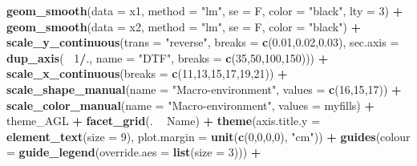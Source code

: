 \documentclass[
]{article}
\newenvironment{Shaded}{\begin{snugshade}}{\end{snugshade}}
\newcommand{\DataTypeTok}[1]{\textcolor[rgb]{0.13,0.29,0.53}{#1}}
\newcommand{\DecValTok}[1]{\textcolor[rgb]{0.00,0.00,0.81}{#1}}
\newcommand{\FloatTok}[1]{\textcolor[rgb]{0.00,0.00,0.81}{#1}}
\newcommand{\KeywordTok}[1]{\textcolor[rgb]{0.13,0.29,0.53}{\textbf{#1}}}
\newcommand{\NormalTok}[1]{#1}
\newcommand{\OperatorTok}[1]{\textcolor[rgb]{0.81,0.36,0.00}{\textbf{#1}}}
\newcommand{\StringTok}[1]{\textcolor[rgb]{0.31,0.60,0.02}{#1}}
\begin{document}
\begin{Shaded}
\begin{Highlighting}[]
{{{{{\StringTok{  }\KeywordTok{geom_smooth}\NormalTok{(}\DataTypeTok{data =}\NormalTok{ x1, }\DataTypeTok{method =} \StringTok{"lm"}\NormalTok{, }\DataTypeTok{se =}\NormalTok{ F, }\DataTypeTok{color =} \StringTok{"black"}\NormalTok{, }\DataTypeTok{lty =} \DecValTok{3}\NormalTok{) }\OperatorTok{+}
\StringTok{  }\KeywordTok{geom_smooth}\NormalTok{(}\DataTypeTok{data =}\NormalTok{ x2, }\DataTypeTok{method =} \StringTok{"lm"}\NormalTok{, }\DataTypeTok{se =}\NormalTok{ F, }\DataTypeTok{color =} \StringTok{"black"}\NormalTok{) }\OperatorTok{+}
\StringTok{  }\KeywordTok{scale_y_continuous}\NormalTok{(}\DataTypeTok{trans =} \StringTok{"reverse"}\NormalTok{, }\DataTypeTok{breaks =} \KeywordTok{c}\NormalTok{(}\FloatTok{0.01}\NormalTok{,}\FloatTok{0.02}\NormalTok{,}\FloatTok{0.03}\NormalTok{),}
        \DataTypeTok{sec.axis =} \KeywordTok{dup_axis}\NormalTok{(}\OperatorTok{~}\StringTok{ }\DecValTok{1}\OperatorTok{/}\NormalTok{., }\DataTypeTok{name =} \StringTok{"DTF"}\NormalTok{, }\DataTypeTok{breaks =} \KeywordTok{c}\NormalTok{(}\DecValTok{35}\NormalTok{,}\DecValTok{50}\NormalTok{,}\DecValTok{100}\NormalTok{,}\DecValTok{150}\NormalTok{))) }\OperatorTok{+}
\StringTok{  }\KeywordTok{scale_x_continuous}\NormalTok{(}\DataTypeTok{breaks =} \KeywordTok{c}\NormalTok{(}\DecValTok{11}\NormalTok{,}\DecValTok{13}\NormalTok{,}\DecValTok{15}\NormalTok{,}\DecValTok{17}\NormalTok{,}\DecValTok{19}\NormalTok{,}\DecValTok{21}\NormalTok{)) }\OperatorTok{+}
\StringTok{  }\KeywordTok{scale_shape_manual}\NormalTok{(}\DataTypeTok{name =} \StringTok{"Macro-environment"}\NormalTok{, }\DataTypeTok{values =} \KeywordTok{c}\NormalTok{(}\DecValTok{16}\NormalTok{,}\DecValTok{15}\NormalTok{,}\DecValTok{17}\NormalTok{)) }\OperatorTok{+}
\StringTok{  }\KeywordTok{scale_color_manual}\NormalTok{(}\DataTypeTok{name =} \StringTok{"Macro-environment"}\NormalTok{, }\DataTypeTok{values =}\NormalTok{ myfills) }\OperatorTok{+}
\StringTok{  }\NormalTok{theme_AGL }\OperatorTok{+}\StringTok{ }\KeywordTok{facet_grid}\NormalTok{(. }\OperatorTok{~}\StringTok{ }\NormalTok{Name) }\OperatorTok{+}\StringTok{ }
\StringTok{  }\KeywordTok{theme}\NormalTok{(}\DataTypeTok{axis.title.y =} \KeywordTok{element_text}\NormalTok{(}\DataTypeTok{size =} \DecValTok{9}\NormalTok{),}
        \DataTypeTok{plot.margin =} \KeywordTok{unit}\NormalTok{(}\KeywordTok{c}\NormalTok{(}\DecValTok{0}\NormalTok{,}\DecValTok{0}\NormalTok{,}\DecValTok{0}\NormalTok{,}\DecValTok{0}\NormalTok{), }\StringTok{"cm"}\NormalTok{)) }\OperatorTok{+}
\StringTok{  }\KeywordTok{guides}\NormalTok{(}\DataTypeTok{colour =} \KeywordTok{guide_legend}\NormalTok{(}\DataTypeTok{override.aes =} \KeywordTok{list}\NormalTok{(}\DataTypeTok{size =} \DecValTok{3}\NormalTok{))) }\OperatorTok{+}
}}}}}
\end{Highlighting}
\end{Shaded}
\end{document}
